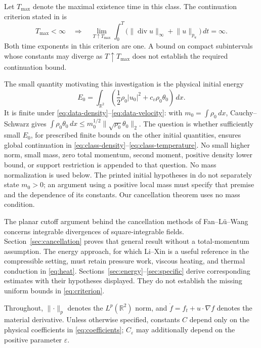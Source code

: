 \documentclass[10pt,twoside]{article}
\newcommand{\R}{\mathbb R}
\newcommand{\dd}{\,dx}
\newcommand{\dt}{\,dt}
\newcommand{\Div}{\operatorname{div}}
\newcommand{\norm}[2]{\lVert#1\rVert_{#2}}
\begin{document}
Let $T_{\max}$ denote the maximal existence time in this class.
The continuation criterion stated in \cite[Theorem 1.2]{Wang} is
\begin{equation}\label{eq:criterion}
 T_{\max}<\infty\quad\Longrightarrow\quad
 \lim_{T\uparrow T_{\max}}\int_0^T
       \bigl(\norm{\Div u}{\infty}+\norm{u}{p_u}\bigr)\dt=\infty.
\end{equation}
Both time exponents in this criterion are one.
A bound on compact subintervals whose constants may diverge as
$T\uparrow T_{\max}$ does not establish the required continuation bound.

The small quantity motivating this investigation is the physical
initial energy
\begin{equation}\label{eq:E0}
 E_0=\int_{\R^2}
       \left(\frac12\rho_0|u_0|^2+c_v\rho_0\theta_0\right)\dd.
\end{equation}
It is finite under \eqref{eq:data-density}--\eqref{eq:data-velocity}:
with $m_0=\int\rho_0\dd$, Cauchy--Schwarz gives
$\int\rho_0\theta_0\dd
 \le m_0^{1/2}\norm{\sqrt{\rho_0}\theta_0}{2}$.
The question is whether sufficiently small $E_0$, for prescribed finite
bounds on the other initial quantities, ensures global continuation in
\eqref{eq:class-density}--\eqref{eq:class-temperature}.
No small higher norm, small mass, zero total momentum, second moment,
positive density lower bound, or support restriction is appended to that
question. No mass normalization is used below.
The printed initial hypotheses in \cite{Wang} do not separately state
$m_0>0$; an argument using a positive local mass must specify that premise
and the dependence of its constants. Our cancellation theorem uses no
mass condition.

The planar cutoff argument behind the cancellation methods of
Fan--L\"u--Wang \cite{FLW} concerns integrable divergences of
square-integrable fields. Section~\ref{sec:cancellation} proves that
general result without a total-momentum assumption.
The energy approach, for which Li--Xin \cite{LiXin} is a useful reference
in the compressible setting, must retain pressure work, viscous heating,
and thermal conduction in \eqref{eq:heat}.
Sections~\ref{sec:energy}--\ref{sec:specific} derive corresponding
estimates with their hypotheses displayed. They do not establish the
missing uniform bounds in \eqref{eq:criterion}.

Throughout, $\norm{\cdot}{p}$ denotes the $L^p(\R^2)$ norm, and
$\dot f=f_t+u\cdot\nabla f$ denotes the material derivative.
Unless otherwise specified, constants $C$ depend only on the physical
coefficients in \eqref{eq:coefficients}; $C_\varepsilon$ may additionally
depend on the positive parameter $\varepsilon$.
\end{document}
